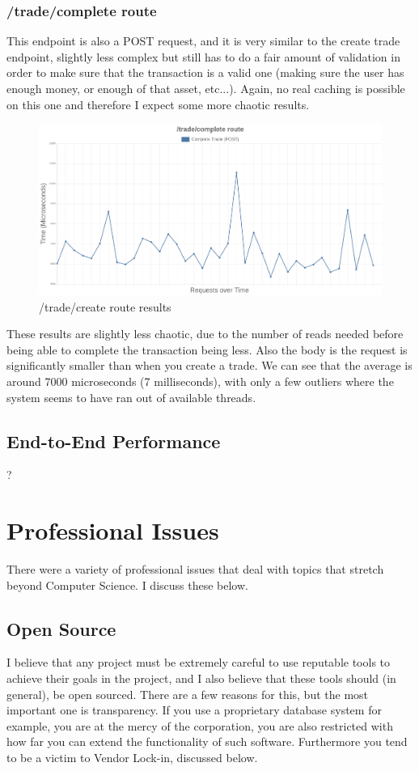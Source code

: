 \documentclass[titlepage]{article}
\begin{document}
\subsubsection{/trade/complete route}
This endpoint is also a POST request, and it is very similar to the create trade endpoint, slightly less complex but still has to do a fair amount of validation in order to make sure that the transaction is a valid one (making sure the user has enough money, or enough of that asset, etc...). Again, no real caching is possible on this one and therefore I expect some more chaotic results.

\begin{figure}[h!]
\includegraphics[width=\textwidth]{../results/complete-trade.png}
  \caption{/trade/create route results}
\end{figure}

These results are slightly less chaotic, due to the number of reads needed before being able to complete the transaction being less. Also the body is the request is significantly smaller than when you create a trade. We can see that the average is around 7000 microseconds (7 milliseconds), with only a few outliers where the system seems to have ran out of available threads. 

\subsection{End-to-End Performance}
?

\pagebreak
\section{Professional Issues}
There were a variety of professional issues that deal with topics that stretch beyond Computer Science. I discuss these below.

\subsection{Open Source}
I believe that any project must be extremely careful to use reputable tools to achieve their goals in the project, and I also believe that these tools should (in general), be open sourced. There are a few reasons for this, but the most important one is transparency. If you use a proprietary database system for example, you are at the mercy of the corporation, you are also restricted with how far you can extend the functionality of such software. Furthermore you tend to be a victim to Vendor Lock-in, discussed below. \\ 
\end{document}

